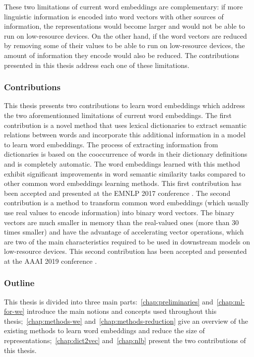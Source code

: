 \noindent These two limitations of current word embeddings are complementary: if
more linguistic information is encoded into word vectors with other sources of
information, the representations would become larger and would not be able to
run on low-resource devices. On the other hand, if the word vectors are reduced
by removing some of their values to be able to run on low-resource devices, the
amount of information they encode would also be reduced. The contributions
presented in this thesis address each one of these limitations.

\subsubsection{Contributions}
  This thesis presents two contributions to learn word embeddings which address
  the two aforementionned limitations of current word embeddings. The first
  contribution is a novel method that uses lexical dictionaries to extract
  semantic relations between words and incorporate this additional information
  in a model to learn word embeddings. The process of extracting information
  from dictionaries is based on the cooccurrence of words in their dictionary
  definitions and is completely automatic. The word embeddings learned with this
  method exhibit significant improvements in word semantic similarity tasks
  compared to other common word embeddings learning methods. This first
  contribution has been accepted and presented at the EMNLP 2017 conference
  \citep{tissier2017dict2vec}. The second contribution is a method to transform
  common word embeddings (which usually use real values to encode information)
  into binary word vectors. The binary vectors are much smaller in memory than
  the real-valued ones (more than 30 times smaller) and have the advantage of
  accelerating vector operations, which are two of the main characteristics
  required to be used in downstream models on low-resource devices. This second
  contribution has been accepted and presented at the AAAI 2019 conference
  \citep{tissier2019near}.

\subsubsection{Outline}
  This thesis is divided into three main parts:~\autoref{chap:preliminaries}
  and~\autoref{chap:ml-for-we} introduce the main notions and concepts used
  throughout this thesis;~\autoref{chap:methods-we}
  and~\autoref{chap:methods-reduction} give an overview of the existing methods
  to learn word embeddings and reduce the size of
  representations;~\autoref{chap:dict2vec} and~\autoref{chap:nlb} present the
  two contributions of this thesis. \medskip

